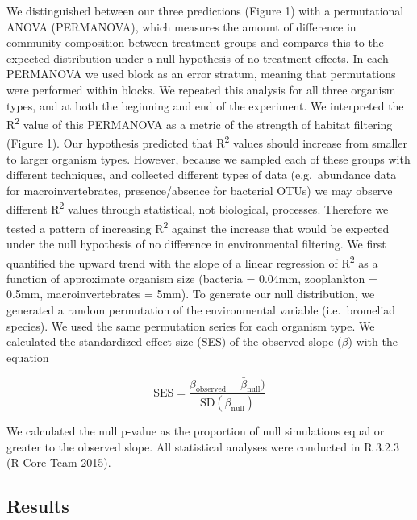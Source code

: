 \documentclass[12pt,]{article}
\begin{document}
We distinguished between our three predictions (Figure 1) with a
permutational ANOVA (PERMANOVA), which measures the amount of difference
in community composition between treatment groups and compares this to
the expected distribution under a null hypothesis of no treatment
effects. In each PERMANOVA we used block as an error stratum, meaning
that permutations were performed within blocks. We repeated this
analysis for all three organism types, and at both the beginning and end
of the experiment. We interpreted the R\textsuperscript{2} value of this
PERMANOVA as a metric of the strength of habitat filtering (Figure 1).
Our hypothesis predicted that R\textsuperscript{2} values should
increase from smaller to larger organism types. However, because we
sampled each of these groups with different techniques, and collected
different types of data (e.g.~abundance data for macroinvertebrates,
presence/absence for bacterial OTUs) we may observe different
R\textsuperscript{2} values through statistical, not biological,
processes. Therefore we tested a pattern of increasing
R\textsuperscript{2} against the increase that would be expected under
the null hypothesis of no difference in environmental filtering. We
first quantified the upward trend with the slope of a linear regression
of R\textsuperscript{2} as a function of approximate organism size
(bacteria = 0.04mm, zooplankton = 0.5mm, macroinvertebrates = 5mm). To
generate our null distribution, we generated a random permutation of the
environmental variable (i.e.~bromeliad species). We used the same
permutation series for each organism type. We calculated the
standardized effect size (SES) of the observed slope (\(\beta\)) with
the equation

\[
\mbox{SES} = \frac{\beta_{\mbox{observed}} - \bar{\beta}_{\mbox{null}})}{\mbox{SD}(\beta_{\mbox{null}})}
\]

We calculated the null p-value as the proportion of null simulations
equal or greater to the observed slope. All statistical analyses were
conducted in R 3.2.3 (R Core Team 2015).

\subsection{Results}\label{results}
\end{document}
